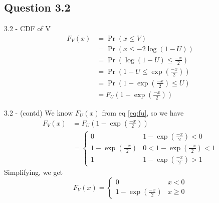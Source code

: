 \documentclass{beamer}
\providecommand{\pr}[1]{\ensuremath{\Pr\left(#1\right)}}
\begin{document}
\subsection{Question 3.2}
\begin{frame}{3.2 - CDF of V}
    \begin{align}
        F_V(x) &= \pr{x \leq V} \\
        &= \pr{x \leq -2 \log (1 - U)} \\
        &= \pr{\log (1 - U) \leq \frac{-x}{2}} \\
        &= \pr{1 - U \leq \exp \left(\frac{-x}{2}\right)} \\
        &= \pr{1 - \exp \left(\frac{-x}{2}\right) \leq U} \\
        &= F_U \left(1 - \exp \left(\frac{-x}{2}\right)\right)
    \end{align}
\end{frame}

\begin{frame}{3.2 - (contd)}
    We know $F_U(x)$ from eq \eqref{eq:fu}, so we have
    \begin{align}
        F_V(x) &= F_U \left(1 - \exp \left(\frac{-x}{2}\right)\right) \\
        &= \begin{cases}
            0 & 1 - \exp \left(\frac{-x}{2}\right) < 0 \\
            1 - \exp \left(\frac{-x}{2}\right) & 0 < 1 - \exp \left(\frac{-x}{2}\right) < 1 \\
            1 & 1 - \exp \left(\frac{-x}{2}\right) > 1
        \end{cases}
    \end{align}
    Simplifying, we get
    \begin{equation}
        F_V(x) = \begin{cases}
            0 & x < 0 \\
            1 - \exp \left(\frac{-x}{2}\right) & x \geq 0
        \end{cases}
    \end{equation}
\end{frame}
\end{document}
